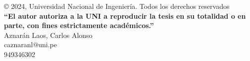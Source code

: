 \begin{permisos}
	\onehalfspacing  %

	© 2024, Universidad Nacional de Ingeniería.
	Todos los derechos reservados \\
	\textbf{
		``El autor autoriza a la UNI a reproducir la tesis en su
		totalidad o en parte, con fines estrictamente académicos.''
	} \\
	Aznarán Laos, Carlos Alonso \\
	caznaranl@uni.pe \\
	949346302

	\singlespacing  %
\end{permisos}
